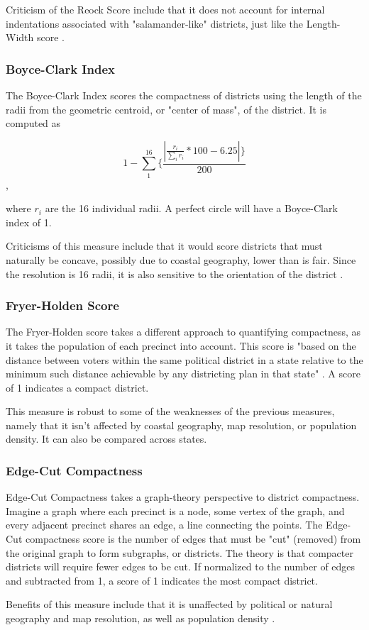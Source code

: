 Criticism of the Reock Score include that it does not account for internal indentations associated with "salamander-like" districts, just like the Length-Width score \parencite{maceachren1985}. 

\subsubsection{Boyce-Clark Index}

The Boyce-Clark Index scores the compactness of districts using the length of the radii from the geometric centroid, or "center of mass", of the district. It is computed as 

\begin{equation}
    1 - \sum_{1}^{16}\{\frac{|\frac{r_i}{\sum_ir_i}*100-6.25 |\}}{200}
\end{equation},

where $r_i$ are the 16 individual radii. A perfect circle will have a Boyce-Clark index of 1. \parencite{boyce1964,fifield2020d}

Criticisms of this measure include that it would score districts that must naturally be concave, possibly due to coastal geography, lower than is fair. Since the resolution is 16 radii, it is also sensitive to the orientation of the district \parencite{boyce1964}.

\subsubsection{Fryer-Holden Score}

The Fryer-Holden score takes a different approach to quantifying compactness, as it takes the population of each precinct into account. This score is "based on the distance between voters within the same political district in a state relative to the minimum such distance achievable by any districting plan in that state" \parencite[2]{fryer2007}. A score of 1 indicates a compact district. 

This measure is robust to some of the weaknesses of the previous measures, namely that it isn't affected by coastal geography, map resolution, or population density. It can also be compared across states. \parencite{fryer2007}

\subsubsection{Edge-Cut Compactness}

Edge-Cut Compactness takes a graph-theory perspective to district compactness. Imagine a graph where each precinct is a node, some vertex of the graph, and every adjacent precinct shares an edge, a line connecting the points. The Edge-Cut compactness score is the number of edges that must be "cut" (removed) from the original graph to form subgraphs, or districts. The theory is that compacter districts will require fewer edges to be cut. \parencite{dube2016} If normalized to the number of edges and subtracted from 1, a score of 1 indicates the most compact district. 

Benefits of this measure include that it is unaffected by political or natural geography and map resolution, as well as population density \parencite[11]{mccartan2020}. 